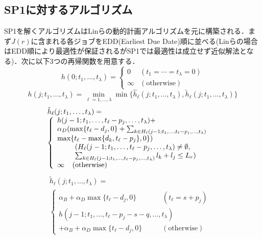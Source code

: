 \documentclass[twoside,twocolumn,11pt]{jarticle}  %
\begin{document}
\subsection{SP1に対するアルゴリズム}
SP1を解くアルゴリズムはLinら\cite{Lin2004}の動的計画アルゴリズムを元に構築される．まず$J(r)$に含まれる各ジョブをEDD(Earliest Due Date)順に並べる(Linらの場合はEDD順により最適性が保証されるがSP1では最適性は成立せず近似解法となる)．次に以下3つの再帰関数を用意する．
\begin{dmath*}
h(0; t_1, \dots, t_\lambda) = \left\{ \begin{array}{ll} 0 & (t_1 = \cdots = t_\lambda = 0) \\ \infty & (\mbox{otherwise}) \end{array} \right.
\end{dmath*}
\begin{dmath*}
h(j; t_1, \dots, t_\lambda) = \min_{\ell=1, \dots, \lambda} \min \{\hat{h}_\ell(j; t_1, \dots, t_\lambda), \tilde{h}_\ell(j; t_1, \dots, t_\lambda) \}
\end{dmath*}
\[
\begin{array}{l}
\hat{h}_\ell(j; t_1, \dots, t_\lambda) = \\
\left\{ \begin{array}{ll}
h(j-1; t_1, \dots, t_\ell - p_j, \dots, t_\lambda) + \\ \alpha_D (\max\{t_\ell - d_j, 0\} + \sum_{k \in H_\ell (j - 1; t_1, \dots, t_\ell - p_j, \dots, t_\lambda)} \\ \max \{ t_\ell - \max\{ d_k, t_\ell - p_j\}, 0 \})
\\ \multicolumn{2}{c}{(H_\ell (j - 1; t_1, \dots, t_\ell - p_j, \dots, t_\lambda) \neq \emptyset, \; \; \;}
\\ \multicolumn{2}{c}{ \sum_{k \in H_\ell (j - 1; t_1, \dots, t_\ell - p_j, \dots, t_\lambda)} l_k + l_j \leq L_r)}
\\ \infty \; \; \; \; (\mbox{otherwise}) & \end{array}
\right.
\end{array}
\]
\[
\begin{array}{l} \tilde{h}_\ell(j; t_1, \dots, t_\lambda) = \\
\left\{ \begin{array}{ll} \alpha_B + \alpha_D \max \{t_\ell - d_j, 0 \} \; \; \; \; \; \; \; \; \; \; \; \; \; (t_\ell = s + p_j)& \\
h(j-1; t_1, \dots, t_\ell - p_j - s - q, \dots, t_\lambda) \\
+ \alpha_B + \alpha_D \max \{t_\ell - d_j, 0 \} \; \; \; \; \; \; \; \; \; \; (\mbox{otherwise}) &
\end{array}
\right.
\end{array}
\]
\end{document}

